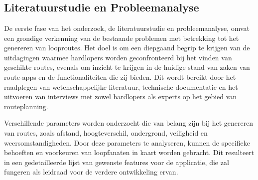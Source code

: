 
\chapter{}%
\label{ch:methodologie}



\section{Literatuurstudie en Probleemanalyse}

De eerste fase van het onderzoek, de literatuurstudie en probleemanalyse, omvat een grondige verkenning van de bestaande problemen met betrekking tot het genereren van looproutes. 
Het doel is om een diepgaand begrip te krijgen van de uitdagingen waarmee hardlopers worden geconfronteerd bij het vinden van geschikte routes, 
evenals om inzicht te krijgen in de huidige stand van zaken van route-apps en de functionaliteiten die zij bieden. Dit wordt bereikt door het raadplegen van wetenschappelijke literatuur, 
technische documentatie en het uitvoeren van interviews met zowel hardlopers als experts op het gebied van routeplanning.

\vspace{1cm}


Verschillende parameters worden onderzocht die van belang zijn bij het genereren van routes, zoals afstand, hoogteverschil, ondergrond, veiligheid en weersomstandigheden. 
Door deze parameters te analyseren, kunnen de specifieke behoeften en voorkeuren van loopfanaten in kaart worden gebracht. Dit resulteert in een gedetailleerde lijst van gewenste features voor de applicatie,
die zal fungeren als leidraad voor de verdere ontwikkeling ervan.

